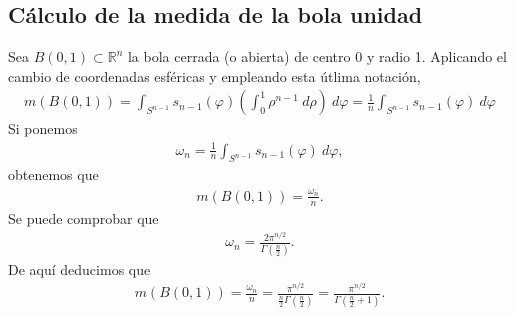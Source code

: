 \subsection{Cálculo de la medida de la bola unidad}
Sea $B(0,1) \subset \mathbb{R}^n$ la bola cerrada (o abierta) de centro 0 y radio 1. Aplicando el cambio de coordenadas esféricas y empleando esta útlima notación,
\begin{align*}
    m(B(0,1)) = \int_{S^{n-1}} s_{n-1}(\varphi)\left( \int_{0}^{1}{\rho^{n-1} \ d\rho} \right) \ d\varphi = \frac{1}{n}\int_{S^{n-1}} s_{n-1}(\varphi) \ d\varphi
\end{align*}
Si ponemos
\begin{align*}
    \omega_n = \frac{1}{n}\int_{S^{n-1}} s_{n-1}(\varphi) \ d\varphi,
\end{align*}
obtenemos que 
\begin{align*}
    m(B(0,1)) = \frac{\omega_n}{n}.
\end{align*}
Se puede comprobar que
\begin{align*}
    \omega_n = \frac{2\pi^{n/2}}{\Gamma\left( \frac{n}{2} \right)}.
\end{align*}
De aquí deducimos que
\begin{align*}
    m(B(0,1)) = \frac{\omega_n}{n} = \frac{\pi^{n/2}}{\frac{n}{2} \Gamma\left( \frac{n}{2} \right)} = \frac{\pi^{n/2}}{\Gamma\left( \frac{n}{2} + 1 \right)}.
\end{align*}
